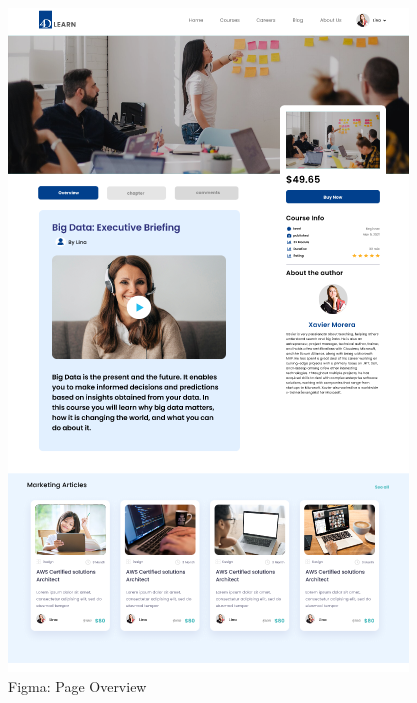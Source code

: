\begin{figure}[H]
    \centering
    \begin{minipage}{0.45\textwidth}
        \centering
        \includegraphics[width=\textwidth]{Figures/overview.PNG}
        \caption{Figma: Page Overview}
    \end{minipage}
    \hfill
    \begin{minipage}{0.45\textwidth}
        \centering

\end{minipage}
\end{figure}
